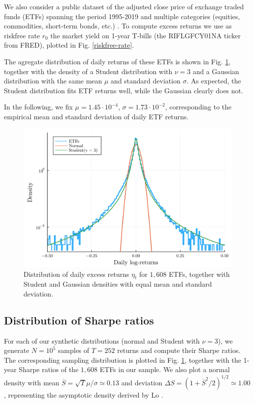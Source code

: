 \documentclass[
reprint,
amsmath,amssymb,
aps,
]{revtex4-2}
\begin{document}
We also consider a public dataset of the adjusted close price of exchange traded funds (ETFs) spanning the period 1995-2019 and multiple categories (equities, commodities, short-term bonds, etc.) \cite{leoneUS}. To compute excess returns we use as riskfree rate $r_0$ the market yield on 1-year T-bills (the RIFLGFCY01NA ticker from FRED), plotted in Fig. \ref{riskfree-rate}. 


The agregate distribution of daily returns of these ETFs is shown in Fig. \ref{returns-dist}, together with the density of a Student distribution with $\nu =3$ and a Gaussian distribution with the same mean $\mu$ and standard deviation $\sigma$. As expected, the Student distribution fits ETF returns well, while the Gaussian clearly does not. 

In the following, we fix $\mu = 1.45\cdot 10^{-4}$, $\sigma = 1.73\cdot 10^{-2}$, corresponding to the empirical mean and standard deviation of daily ETF returns. 

\begin{figure}[t!]
    \includegraphics[width = .45\textwidth]{../plots/returns-dist.png}
    \caption{Distribution of daily excess returns $\eta_t$ for $1,608$ ETFs, together with Student and Gaussian densities with equal mean and standard deviation.}
    \label{returns-dist}
\end{figure}

\subsection{Distribution of Sharpe ratios}

For each of our synthetic distributions (normal and Student with $\nu =3$), we generate $N = 10^5$ samples of $T = 252$ returns and compute their Sharpe ratios. 
The corresponding sampling distribution is plotted in Fig. \ref{returns-dist}, together with the 1-year Sharpe ratios of the $1,608$ ETFs in our sample. 
We also plot a normal density with mean $\overline{S} = \sqrt{T}\mu/\sigma\simeq 0.13$ and deviation $\Delta S = (1+\overline{S}^2/2)^{1/2}\simeq 1.00$, representing the asymptotic density derived by Lo \cite{loStatistics2002}. 
\end{document}
